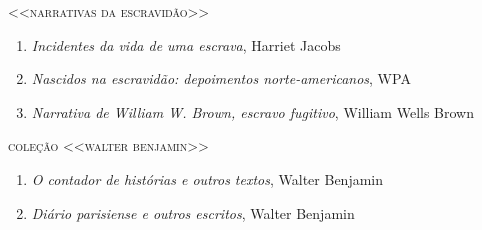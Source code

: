 \medskip
{\large\textsc{<<narrativas da escravidão>>}}

\begin{enumerate}
\setlength\parskip{4.2pt}
\setlength\itemsep{-1.4mm}
\item \textit{Incidentes da vida de uma escrava}, Harriet Jacobs
\item \textit{Nascidos na escravidão: depoimentos norte-americanos}, WPA
\item \textit{Narrativa de William W. Brown, escravo fugitivo}, William Wells Brown
\end{enumerate}

\medskip
{\large\textsc{coleção <<walter benjamin>>}}

\begin{enumerate}
\setlength\parskip{4.2pt}
\setlength\itemsep{-1.4mm}
\item \textit{O contador de histórias e outros textos}, Walter Benjamin
\item \textit{Diário parisiense e outros escritos}, Walter Benjamin
\end{enumerate}

\endgroup

\pagebreak
\ifodd\thepage\paginabranca\else\clearpage\fi
